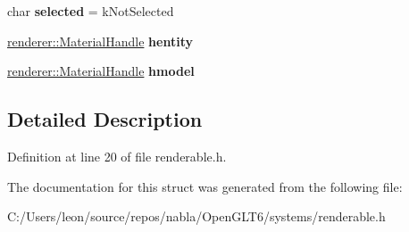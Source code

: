 \begin{DoxyCompactItemize}
char {\bfseries selected} = k\+Not\+Selected
\item 
\mbox{\label{structnabla_1_1_renderable_system_1_1_renderable_adc74c4d370060e8d23ecc7b8998479ff}} 
\mbox{\hyperlink{classnabla_1_1renderer_1_1_handle}{renderer\+::\+Material\+Handle}} {\bfseries hentity}
\item 
\mbox{\label{structnabla_1_1_renderable_system_1_1_renderable_a81d7d8f03bf475ddebbc0f14a24098e7}} 
\mbox{\hyperlink{classnabla_1_1renderer_1_1_handle}{renderer\+::\+Material\+Handle}} {\bfseries hmodel}
\end{DoxyCompactItemize}


\subsection{Detailed Description}


Definition at line 20 of file renderable.\+h.



The documentation for this struct was generated from the following file\+:\begin{DoxyCompactItemize}
\item 
C\+:/\+Users/leon/source/repos/nabla/\+Open\+G\+L\+T6/systems/renderable.\+h\end{DoxyCompactItemize}

